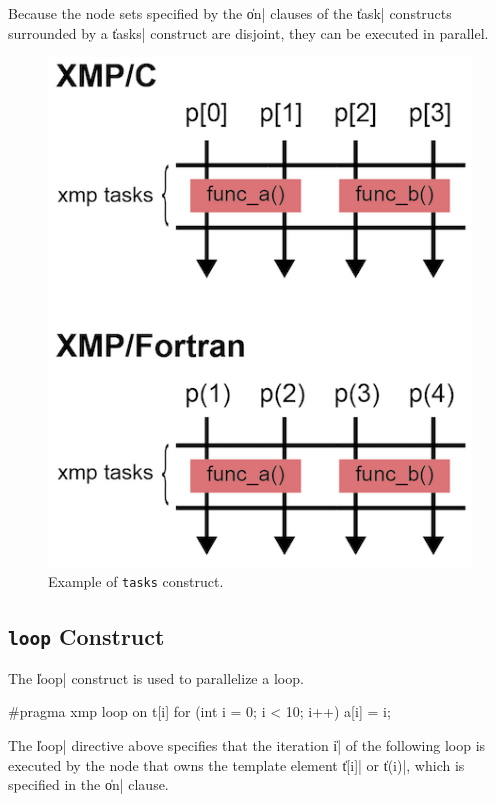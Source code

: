 Because the node sets specified by the \|on| clauses of the \|task|
constructs surrounded by a \|tasks| construct are disjoint, they can be
executed in parallel.

\begin{figure}
  \centering
  \includegraphics{figs/tasks.png}
  \caption{Example of {\tt tasks} construct.}
\end{figure}


\subsection{{\tt loop} Construct}

The \|loop| construct is used to parallelize a loop.

\begin{XCexample}
#pragma xmp loop on t[i]
  for (int i = 0; i < 10; i++)
    a[i] = i;
\end{XCexample}


The \|loop| directive above specifies that the iteration \|i| of the
following loop is executed by the node that owns the template element
\|t[i]| or \|t(i)|, which is specified in the \|on| clause.

